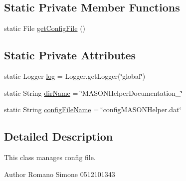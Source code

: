 \subsection*{Static Private Member Functions}
\begin{DoxyCompactItemize}
\item 
static File \hyperlink{classit_1_1isislab_1_1masonhelperdocumentation_1_1mason_1_1control_1_1_config_file_ac533dd01e862be359ae060d278daf1ea}{get\-Config\-File} ()
\end{DoxyCompactItemize}
\subsection*{Static Private Attributes}
\begin{DoxyCompactItemize}
\item 
static Logger \hyperlink{classit_1_1isislab_1_1masonhelperdocumentation_1_1mason_1_1control_1_1_config_file_a1e0cc7c39d846dcf3dd9def42f836e89}{log} = Logger.\-get\-Logger(\char`\"{}global\char`\"{})
\item 
static String \hyperlink{classit_1_1isislab_1_1masonhelperdocumentation_1_1mason_1_1control_1_1_config_file_a7d8bbffdbfca146a398ed0bba454f347}{dir\-Name} = \char`\"{}M\-A\-S\-O\-N\-Helper\-Documentation\-\_\-\char`\"{}
\item 
static String \hyperlink{classit_1_1isislab_1_1masonhelperdocumentation_1_1mason_1_1control_1_1_config_file_a46a4e9d3359f002ff462e19976987878}{config\-File\-Name} = \char`\"{}config\-M\-A\-S\-O\-N\-Helper.\-dat\char`\"{}
\end{DoxyCompactItemize}


\subsection{Detailed Description}
This class manages config file.

\begin{DoxyAuthor}{Author}
Romano Simone 0512101343 
\end{DoxyAuthor}


